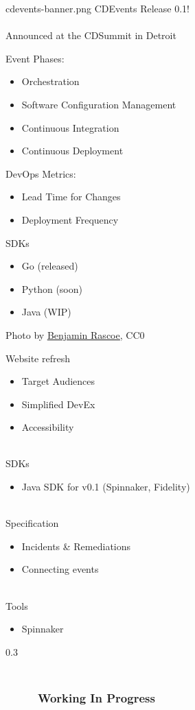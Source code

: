 \documentclass[aspectratio=169,11pt,hyperref={colorlinks=true}]{beamer}
\begin{document}
\begin{tpicstripedframe}%
  {cdevents-banner.png}
  {%
  \large{CDEvents Release 0.1!}
  ~ \\
  ~ \\
  Announced at the CDSummit in Detroit
  }%
  {%
  Event Phases:
  \begin{itemize}
    \item Orchestration
    \item Software Configuration Management
    \item Continuous Integration
    \item Continuous Deployment
  \end{itemize}
  }%
  {%
  DevOps Metrics:
  \begin{itemize}
    \item Lead Time for Changes
    \item Deployment Frequency
  \end{itemize}
  }%
  {%
  SDKs \\
  \vspace{0.01\textheight}
  \begin{itemize}
    \item Go (released)
    \item Python (soon)
    \item Java (WIP)
  \end{itemize}
  }%
\end{tpicstripedframe}

\begin{lpicrblack}{Photo by \href{https://unsplash.com/@dapperprofessional}{\underline{Benjamin Rascoe}}, CC0}%
  {%
  Website refresh
  \begin{itemize}
    \item Target Audiences
    \item Simplified DevEx
    \item Accessibility 
  \end{itemize}
  ~ \\
  SDKs
  \begin{itemize}
    \item Java SDK for v0.1 (Spinnaker, Fidelity)
  \end{itemize}
  ~ \\
  Specification
  \begin{itemize}
    \item Incidents \& Remediations
    \item Connecting events
  \end{itemize}
  ~ \\
  Tools
  \begin{itemize}
    \item Spinnaker
  \end{itemize}
  }%
  {0.3}
  \frametitle{~~~~~~~~~~~~~~~~~~~~~~~~~~~~~~~~~~~~~~~~~~~~~~~~~~~~~~~~~~Working In Progress}
\end{lpicrblack}
\end{document}

